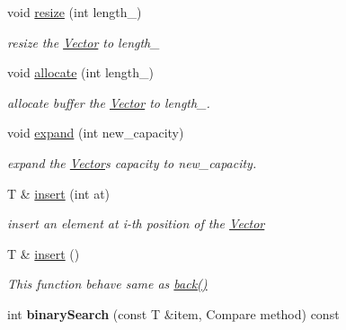\begin{DoxyCompactItemize}
\item 
void \hyperlink{class_magnum_1_1_vector_a05c838dd9a909c2cc729dfbaa3e22fdb}{resize} (int length\+\_\+)
\begin{DoxyCompactList}\small\item\em resize the \hyperlink{class_magnum_1_1_vector}{Vector} to length\+\_\+ \end{DoxyCompactList}\item 
void \hyperlink{class_magnum_1_1_vector_a6737ec02b4803c01eef99a08a34eec6c}{allocate} (int length\+\_\+)
\begin{DoxyCompactList}\small\item\em allocate buffer the \hyperlink{class_magnum_1_1_vector}{Vector} to length\+\_\+. \end{DoxyCompactList}\item 
void \hyperlink{class_magnum_1_1_vector_a52279501ad72e02b91c0351eba25ef9a}{expand} (int new\+\_\+capacity)
\begin{DoxyCompactList}\small\item\em expand the \hyperlink{class_magnum_1_1_vector}{Vector}\textquotesingle{}s capacity to new\+\_\+capacity. \end{DoxyCompactList}\item 
T \& \hyperlink{class_magnum_1_1_vector_ad5bb418fb5a17fdadb10580b4c546311}{insert} (int at)
\begin{DoxyCompactList}\small\item\em insert an element at i-\/th position of the \hyperlink{class_magnum_1_1_vector}{Vector} \end{DoxyCompactList}\item 
T \& \hyperlink{class_magnum_1_1_vector_a5dc89524d89d7a48070fe98927290875}{insert} ()
\begin{DoxyCompactList}\small\item\em This function behave same as \hyperlink{class_magnum_1_1_vector_a630a21421716742f8d64622dc6e198f2}{back()} \end{DoxyCompactList}\item 
int {\bfseries binary\+Search} (const T \&item, Compare method) const \hypertarget{class_magnum_1_1_vector_a6dd54af6cd164a775f3e658a460118e0}{}\label{class_magnum_1_1_vector_a6dd54af6cd164a775f3e658a460118e0}


\end{DoxyCompactItemize}
